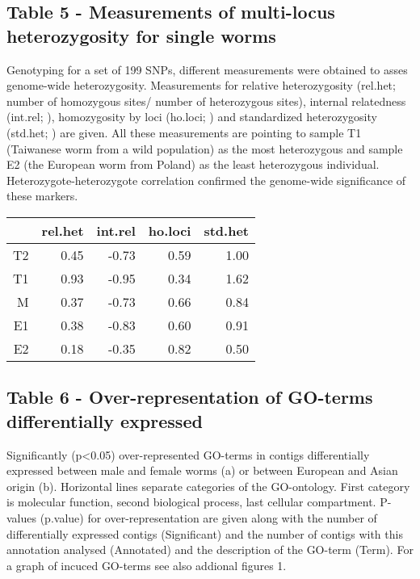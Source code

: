 \documentclass[10pt]{bmc_article}
\newenvironment{bmcformat}{\begin{raggedright}\baselineskip20pt\sloppy\setboolean{publ}{false}}{\end{raggedright}\baselineskip20pt\sloppy}
\begin{document}
\begin{bmcformat}
\subsection{Table 5 - Measurements of multi-locus heterozygosity for
  single worms}

Genotyping for a set of 199 SNPs, different measurements
were obtained to asses genome-wide heterozygosity. Measurements for
relative heterozygosity (rel.het; number of homozygous sites/ number
of heterozygous sites), internal relatedness (int.rel;
\cite{pmid11571049}), homozygosity by loci (ho.loci;
\cite{pmid17107491}) and standardized heterozygosity (std.het;
\cite{coltman81j}) are given.  All these measurements are pointing to
sample T1 (Taiwanese worm from a wild population) as the most
heterozygous and sample E2 (the European worm from Poland) as the
least heterozygous individual. Heterozygote-heterozygote correlation
\cite{pmid21565077} confirmed the genome-wide significance of these
markers.

\begin{table}[ht]
\begin{center}
\begin{tabular}{rrrrr}
  \hline
 & rel.het & int.rel & ho.loci & std.het \\ 
  \hline
T2 & 0.45 & -0.73 & 0.59 & 1.00 \\ 
  T1 & 0.93 & -0.95 & 0.34 & 1.62 \\ 
  M & 0.37 & -0.73 & 0.66 & 0.84 \\ 
  E1 & 0.38 & -0.83 & 0.60 & 0.91 \\ 
  E2 & 0.18 & -0.35 & 0.82 & 0.50 \\ 
   \hline
\end{tabular}
\end{center}
\end{table}
\subsection{Table 6 - Over-representation of GO-terms differentially
  expressed}

Significantly (p<0.05) over-represented GO-terms in contigs
differentially expressed between male and female worms (a) or between
European and Asian origin (b). Horizontal lines separate categories of
the GO-ontology. First category is molecular function, second
biological process, last cellular compartment. P-values (p.value) for
over-representation are given along with the number of differentially
expressed contigs (Significant) and the number of contigs with this
annotation analysed (Annotated) and the description of the GO-term
(Term). For a graph of
incuced GO-terms see also addional figures 1.\\


\end{bmcformat}
\end{document}
